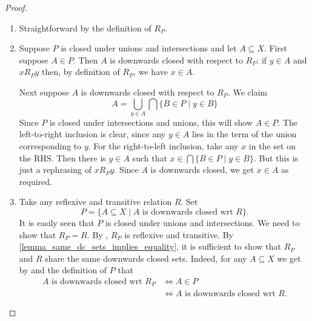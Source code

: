 \begin{proof}\leavevmode
    \begin{enumerate}\small
        \item Straightforward by the definition of $R_P$.

        \item Suppose $P$ is closed under unions and intersections and let $A
              \subseteq X$.  First suppose $A \in P$. Then $A$ is downwards
              closed with respect to $R_P$: if $y \in A$ and $x{R_P}y$ then, by
              definition of $R_P$, we have $x \in A$.

              Next suppose $A$ is downwards closed with respect to $R_P$. We
              claim \[ A = \bigcup_{y \in A}\bigcap\{B \in P \mid y \in B\} \]
              Since $P$ is closed under intersections and unions, this will
              show $A \in P$. The left-to-right inclusion is clear, since any
              $y \in A$ lies in the term of the union corresponding to $y$. For
              the right-to-left inclusion, take any $x$ in the set on the RHS.
              Then there is $y \in A$ such that $x \in \bigcap\{B \in P \mid y
              \in B\}$. But this is just a rephrasing of $x{R_P}y$. Since $A$
              is downwards closed, we get $x \in A$ as required.

        \item Take any reflexive and transitive relation $R$. Set
              \[
                  P
                  =
                  \{A \subseteq X \mid A \text{ is downwards closed wrt } R\}.
                \]
              It is easily seen that $P$ is closed under unions and
              intersections. We need to show that $R_P = R$.
              By , $R_P$ is reflexive and
              transitive.  By \cref{lemma_same_dc_sets_implies_equality}, it is
              sufficient to show that $R_P$ and $R$ share the same downwards
              closed sets.  Indeed, for any $A \subseteq X$ we get by
               and the definition of $P$ that
              \[
              \begin{aligned}
                  A \text{ is downwards closed wrt } R_P
                  &\iff A \in P \\
                  &\iff A \text{ is downwards closed wrt } R.
              \end{aligned}
              \]

    \end{enumerate}
\end{proof}

